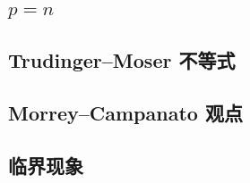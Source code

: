 

\subsection{\texorpdfstring{\(p=n\)}{p=n}}
\label{b1:subsec:240501}

\subsection{Trudinger–Moser 不等式}
\label{b1:subsec:240502}

\subsection{Morrey–Campanato 观点}
\label{b1:subsec:240503}

\subsection{临界现象}
\label{b1:subsec:240504}


